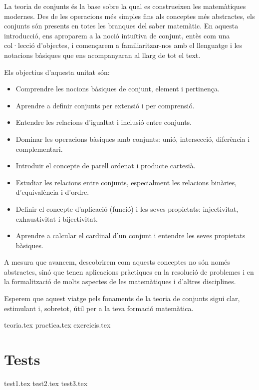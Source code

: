 \documentclass[12pt,a4paper,oneside]{book}
\theoremstyle{plain}
\theoremstyle{definition}
\theoremstyle{remark}
\numberwithin{equation}{section}
\begin{document}
La teoria de conjunts és la base sobre la qual es construeixen les matemàtiques modernes. Des de les operacions més simples fins als conceptes més abstractes, els conjunts són presents en totes les branques del saber matemàtic. En aquesta introducció, ens aproparem a la noció intuïtiva de conjunt, entès com una col·lecció d’objectes, i començarem a familiaritzar-nos amb el llenguatge i les notacions bàsiques que ens acompanyaran al llarg de tot el text.

\bigskip

Els objectius d’aquesta unitat són:

\begin{itemize}
\item Comprendre les nocions bàsiques de conjunt, element i pertinença.

\item Aprendre a definir conjunts per extensió i per comprensió.

\item Entendre les relacions d’igualtat i inclusió entre conjunts.

\item Dominar les operacions bàsiques amb conjunts: unió, intersecció, diferència i complementari.

\item Introduir el concepte de parell ordenat i producte cartesià.

\item Estudiar les relacions entre conjunts, especialment les relacions binàries, d’equivalència i d’ordre.

\item Definir el concepte d’aplicació (funció) i les seves propietats: injectivitat, exhaustivitat i bijectivitat.

\item Aprendre a calcular el cardinal d’un conjunt i entendre les seves propietats bàsiques.
\end{itemize}

\bigskip
A mesura que avancem, descobrirem com aquests conceptes no són només abstractes, sinó que tenen aplicacions pràctiques en la resolució de problemes i en la formalització de molts aspectes de les matemàtiques i d’altres disciplines.

\bigskip

Esperem que aquest viatge pels fonaments de la teoria de conjunts sigui clar, estimulant i, sobretot, útil per a la teva formació matemàtica.

\let\cleardoublepage\clearpage

\mainmatter

{teoria.tex}
{practica.tex}
{exercicis.tex}

\chapter{Tests}

\label{cap:tests}

{test1.tex} {test2.tex} %
{test3.tex}

\backmatter
\end{document}
